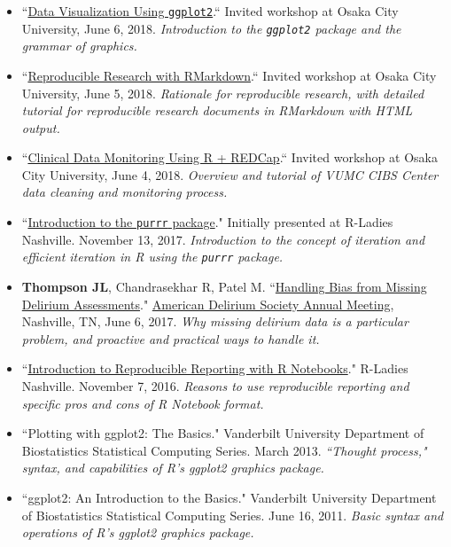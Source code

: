 \documentclass[5pt]{article}
\begin{document}
\begin{itemize}
\item ``\href{https://jenthompson.me/slides/DataVisggplot22018/datavis_ggplot2.html}{Data Visualization Using \texttt{ggplot2}}.`` Invited workshop at Osaka City University, June 6, 2018. \emph{Introduction to the \texttt{ggplot2} package and the grammar of graphics.}
\item ``\href{https://jenthompson.me/slides/RepResRMD/rmarkdownworkshop.html}{Reproducible Research with RMarkdown}.`` Invited workshop at Osaka City University, June 5, 2018. \emph{Rationale for reproducible research, with detailed tutorial for reproducible research documents in RMarkdown with HTML output.}
\item ``\href{https://github.com/jenniferthompson/DataCleanExample}{Clinical Data Monitoring Using R + REDCap}.`` Invited workshop at Osaka City University, June 4, 2018. \emph{Overview and tutorial of VUMC CIBS Center data cleaning and monitoring process.}
\item ``\href{https://github.com/jenniferthompson/RLadiesIntroToPurrr}{Introduction to the \texttt{purrr} package}." Initially presented at R-Ladies Nashville. November 13, 2017. \emph{Introduction to the concept of iteration and efficient iteration in R using the \texttt{purrr} package.}
\item \textbf{Thompson JL}, Chandrasekhar R, Patel M. ``\href{https://github.com/jenniferthompson/ADS2017}{Handling Bias from Missing Delirium Assessments}." \href{http://www.cvent.com/events/7th-annual-american-delirium-society/event-summary-cd74fed5605a4918bc0a9c0e28561bac.aspx}{American Delirium Society Annual Meeting}, Nashville, TN, June 6, 2017. \emph{Why missing delirium data is a particular problem, and proactive and practical ways to handle it.}
\item ``\href{https://github.com/rladies/meetup-presentations_nashville/blob/master/2016-11-07_RNotebooks.md}{Introduction to Reproducible Reporting with R Notebooks}." R-Ladies Nashville. November 7, 2016. \emph{Reasons to use reproducible reporting and specific pros and cons of R Notebook format.}
\item ``Plotting with ggplot2: The Basics." Vanderbilt University Department of Biostatistics Statistical Computing Series. March 2013. \emph{``Thought process," syntax, and capabilities of R's ggplot2 graphics package.}
\item ``ggplot2: An Introduction to the Basics." Vanderbilt University Department of Biostatistics Statistical Computing Series. June 16, 2011. \emph{Basic syntax and operations of R’s ggplot2 graphics package.}

\end{itemize}
\end{document}

